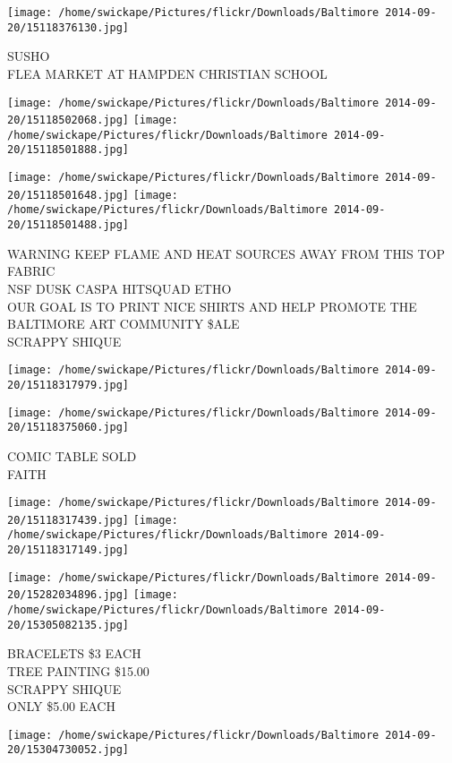 \documentclass[10pt,letterpaper]{article}
\begin{document}
\vspace{0.25in}
\texttt{[image: /home/swickape/Pictures/flickr/Downloads/Baltimore 2014-09-20/15118376130.jpg]}

SUSHO\\
FLEA MARKET AT HAMPDEN CHRISTIAN SCHOOL
\pagebreak

\texttt{[image: /home/swickape/Pictures/flickr/Downloads/Baltimore 2014-09-20/15118502068.jpg]}
\texttt{[image: /home/swickape/Pictures/flickr/Downloads/Baltimore 2014-09-20/15118501888.jpg]}

\texttt{[image: /home/swickape/Pictures/flickr/Downloads/Baltimore 2014-09-20/15118501648.jpg]}
\texttt{[image: /home/swickape/Pictures/flickr/Downloads/Baltimore 2014-09-20/15118501488.jpg]}

WARNING KEEP FLAME AND HEAT SOURCES AWAY FROM THIS TOP FABRIC\\
NSF DUSK CASPA HITSQUAD ETHO\\
OUR GOAL IS TO PRINT NICE SHIRTS AND HELP PROMOTE THE BALTIMORE ART COMMUNITY \$ALE\\
SCRAPPY SHIQUE
\pagebreak

\texttt{[image: /home/swickape/Pictures/flickr/Downloads/Baltimore 2014-09-20/15118317979.jpg]}

\vspace{0.25in}
\texttt{[image: /home/swickape/Pictures/flickr/Downloads/Baltimore 2014-09-20/15118375060.jpg]}

COMIC TABLE SOLD\\
FAITH
\pagebreak

\texttt{[image: /home/swickape/Pictures/flickr/Downloads/Baltimore 2014-09-20/15118317439.jpg]}
\texttt{[image: /home/swickape/Pictures/flickr/Downloads/Baltimore 2014-09-20/15118317149.jpg]}

\texttt{[image: /home/swickape/Pictures/flickr/Downloads/Baltimore 2014-09-20/15282034896.jpg]}
\texttt{[image: /home/swickape/Pictures/flickr/Downloads/Baltimore 2014-09-20/15305082135.jpg]}

BRACELETS \$3 EACH\\
TREE PAINTING \$15.00\\
SCRAPPY SHIQUE\\
ONLY \$5.00 EACH
\pagebreak

\texttt{[image: /home/swickape/Pictures/flickr/Downloads/Baltimore 2014-09-20/15304730052.jpg]}
\end{document}
